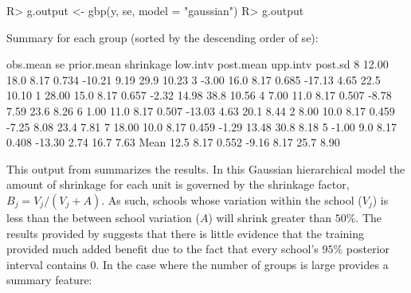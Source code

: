 \documentclass[article]{jss}
\begin{document}
\begin{CodeChunk}
\begin{CodeInput}
R> g.output <- gbp(y, se, model = "gaussian")
R> g.output
\end{CodeInput}
\begin{CodeOutput}
Summary for each group (sorted by the descending order of se): 

     obs.mean   se prior.mean shrinkage low.intv post.mean upp.intv post.sd
8       12.00 18.0       8.17     0.734   -10.21      9.19     29.9   10.23
3       -3.00 16.0       8.17     0.685   -17.13      4.65     22.5   10.10
1       28.00 15.0       8.17     0.657    -2.32     14.98     38.8   10.56
4        7.00 11.0       8.17     0.507    -8.78      7.59     23.6    8.26
6        1.00 11.0       8.17     0.507   -13.03      4.63     20.1    8.44
2        8.00 10.0       8.17     0.459    -7.25      8.08     23.4    7.81
7       18.00 10.0       8.17     0.459    -1.29     13.48     30.8    8.18
5       -1.00  9.0       8.17     0.408   -13.30      2.74     16.7    7.63
Mean          12.5       8.17     0.552    -9.16      8.17     25.7    8.90
\end{CodeOutput}
\end{CodeChunk}
This output from  summarizes the results. In this Gaussian hierarchical model the amount of shrinkage for each unit is governed by the shrinkage factor, $B_j = V_j/(V_j + A)$. As such, schools whose variation within the school ($V_{j}$) is less than the between school variation ($A$) will shrink greater than $50\%$. The results provided by  suggests that there is little evidence that the training provided much added benefit due to the fact that every school's $95\%$ posterior interval contains 0. In the case where the number of groups is large  provides a summary feature:
\end{document}
